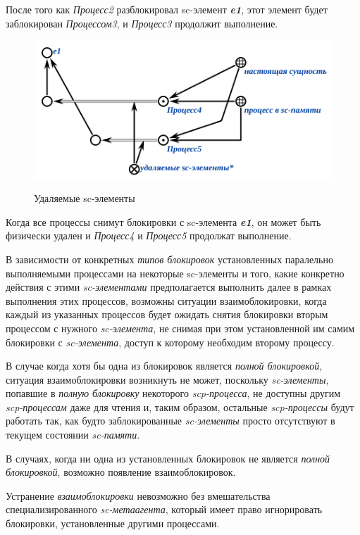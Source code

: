После того как \textit{Процесс2} разблокировал sc-элемент \textit{\textbf{e1}}, этот элемент будет заблокирован \textit{Процессом3}, и \textit{Процесс3} продолжит выполнение.

\begin{figure}[H]
	\centering
	\caption{Удаляемые sc-элементы}
	\includegraphics[scale=0.8]{images/part3/chapter_situation_management/plan_lock_4.png}
	\label{fig:plan_lock_4}
\end{figure}

Когда все процессы снимут блокировки с sc-элемента \textit{\textbf{e1}}, он может быть физически удален и \textit{Процесс4} и \textit{Процесс5} продолжат выполнение.

В зависимости от конкретных \textit{типов блокировок} установленных паралельно выполняемыми процессами на некоторые sc-элементы и того, какие конкретно действия с этими \textit{sc-элементами} предполагается выполнить далее в рамках выполнения этих процессов, возможны ситуации взаимоблокировки, когда каждый из указанных процессов будет ожидать снятия блокировки вторым процессом с нужного \textit{sc-элемента}, не снимая при этом установленной им самим блокировки с \textit{sc-элемента}, доступ к которому необходим второму процессу.
	
В случае когда хотя бы одна из блокировок является \textit{полной блокировкой}, ситуация взаимоблокировки возникнуть не может, поскольку \textit{sc-элементы}, попавшие в \textit{полную блокировку} некоторого \textit{scp-процесса}, не доступны другим \textit{scp-процессам} даже для чтения и, таким образом, остальные \textit{scp-процессы} будут работать так, как будто заблокированные \textit{sc-элементы} просто отсутствуют в текущем состоянии \textit{sc-памяти}.

В случаях, когда ни одна из установленных блокировок не является \textit{полной блокировкой}, возможно появление взаимоблокировок.

Устранение \textit{взаимоблокировки} невозможно без вмешательства специализированного \textit{sc-метаагента}, который имеет право игнорировать блокировки, установленные другими процессами. 
	
